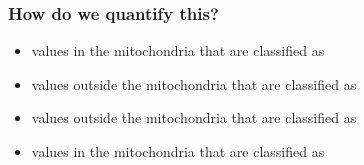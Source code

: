 \documentclass[letterpaper,10pt,english]{sphinxmanual}
\begin{document}
\subsubsection{How do we quantify this?}
\label{\detokenize{04-BasicSegmentation_Part2:how-do-we-quantify-this}}

\begin{itemize}
\item {} 
\sphinxAtStartPar
{} values in the mitochondria that are classified as 

\item {} 
\sphinxAtStartPar
{} values outside the mitochondria that are classified as 

\end{itemize}




\begin{itemize}
\item {} 
\sphinxAtStartPar
{} values outside the mitochondria that are classified as 

\item {} 
\sphinxAtStartPar
{} values in the mitochondria that are classified as 

\end{itemize}
\end{document}
